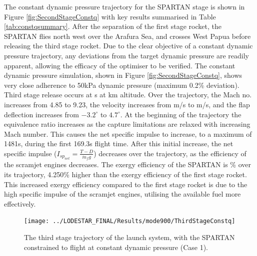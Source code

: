The constant dynamic pressure trajectory for the SPARTAN stage is shown in Figure \ref{fig:SecondStageConstq} with key results summarised in Table \ref{tab:constqsummary}. After the separation of the first stage rocket, the SPARTAN flies north west over the Arafura Sea, and crosses West Papua before releasing the third stage rocket. Due to the clear objective of a constant dynamic pressure trajectory, any deviations from the target dynamic pressure are readily apparent, allowing the efficacy of the optimiser to be verified. 
The constant dynamic pressure simulation, shown in Figure \ref{fig:SecondStageConstq}, shows very close adherence to 50kPa dynamic pressure (maximum 0.2\% deviation). Third stage release occurs at \secondFlightTimeConstq s at \secondthirdSeparationAltConstq km altitude. 
Over the trajectory, the Mach no. increases from 4.85 to 9.23, the velocity increases from \firstsecondSeparationvConstq m/s to \secondthirdSeparationvConstq m/s, and the flap deflection increases from $-3.2^\circ$ to $4.7^\circ$. At the beginning of the trajectory the equivalence ratio increases as the capture limitations are relaxed with increasing Mach number. This causes the net specific impulse to increase, to a maximum of 1481s, during the first 169.3s flight time.  After this initial increase, the net specific impulse ($I_{sp_{net}} = \frac{T-D}{\dot{m}_f g}$) decreases over the trajectory, as the efficiency of the scramjet engines decreases. 
The exergy efficiency of the SPARTAN is \secondExergyEffConstq \% over its trajectory, 4.250\% higher than the exergy efficiency of the first stage rocket. This increased exergy efficiency compared to the first stage rocket is due to the high specific impulse of the scramjet engines, utilising the available fuel more effectively. 



\begin{figure}[ht!]
\centering
\texttt{[image: ../LODESTAR\_FINAL/Results/mode900/ThirdStageConstq]}
\caption{The third stage trajectory of the launch system, with the SPARTAN constrained to flight at constant dynamic pressure (Case 1).}
\label{fig:ThirdStageConstq}
\end{figure}

